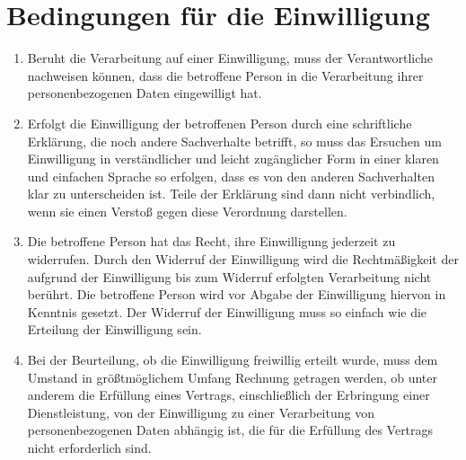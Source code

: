 \chapter{Bedingungen für die Einwilligung}
\label{ch:07}


\begin{enumerate}

  \item Beruht die Verarbeitung auf einer Einwilligung, muss der Verantwortliche nachweisen können, dass die betroffene
   Person in die Verarbeitung ihrer personenbezogenen Daten eingewilligt hat.
  \label{itm:07-1}

  \item Erfolgt die Einwilligung der betroffenen Person durch eine schriftliche Erklärung, die noch andere Sachverhalte
   betrifft, so muss das Ersuchen um Einwilligung in verständlicher und leicht zugänglicher Form in einer klaren und
   einfachen Sprache so erfolgen, dass es von den anderen Sachverhalten klar zu unterscheiden ist. Teile der Erklärung
   sind dann nicht verbindlich, wenn sie einen Verstoß gegen diese Verordnung darstellen.
  \label{itm:07-2}

  \item Die betroffene Person hat das Recht, ihre Einwilligung jederzeit zu widerrufen. Durch den Widerruf der
   Einwilligung wird die Rechtmäßigkeit der aufgrund der Einwilligung bis zum Widerruf erfolgten Verarbeitung nicht
   berührt. Die betroffene Person wird vor Abgabe der Einwilligung hiervon in Kenntnis gesetzt. Der Widerruf der
   Einwilligung muss so einfach wie die Erteilung der Einwilligung sein.
  \label{itm:07-3}

  \item Bei der Beurteilung, ob die Einwilligung freiwillig erteilt wurde, muss dem Umstand in größtmöglichem Umfang
   Rechnung getragen werden, ob unter anderem die Erfüllung eines Vertrags, einschließlich der Erbringung einer
   Dienstleistung, von der Einwilligung zu einer Verarbeitung von personenbezogenen Daten abhängig ist, die für die
   Erfüllung des Vertrags nicht erforderlich sind.
  \label{itm:07-4}

\end{enumerate}


